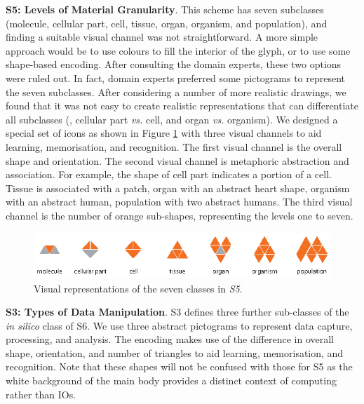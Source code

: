 \textbf{S5: Levels of Material Granularity}.
This scheme has seven subclasses (molecule, cellular part, cell, tissue, organ, organism, and population), and finding a suitable visual channel was not straightforward.
A more simple approach would be to use colours to fill the interior of the glyph, or to use some shape-based encoding.
After consulting the domain experts, these two options were ruled out.
In fact, domain experts preferred some pictograms to represent the seven subclasses.
After considering a number of more realistic drawings, we found that it was not easy to create realistic representations that can differentiate all subclasses (\eg, cellular part \emph{vs.} cell, and organ \emph{vs.} organism).
We designed a special set of icons as shown in Figure \ref{fig:s5-metaphor} with three visual channels to aid learning, memorisation, and recognition.
The first visual channel is the overall shape and orientation.
The second visual channel is metaphoric abstraction and association.
For example, the shape of cell part indicates a portion of a cell.
Tissue is associated with a patch, organ with an abstract heart shape, organism with an abstract human, population with two abstract humans.
The third visual channel is the number of orange sub-shapes, representing the levels one to seven.
\begin{figure}[t!]
\centering
\includegraphics[width=.8\textwidth]{images/glyph-taxonomy/s5-metaphor.eps}
\caption{Visual representations of the seven classes in \emph{S5}.}
\label{fig:s5-metaphor}
\vspace{-10pt}
\end{figure}

\textbf{S3: Types of Data Manipulation}.
S3 defines three further sub-classes of the \emph{in silico} class of S6.
We use three abstract pictograms to represent data capture, processing, and analysis.
The encoding makes use of the difference in overall shape, orientation, and number of triangles to aid learning, memorisation, and recognition.
Note that these shapes will not be confused with those for S5 as the white background of the main body provides a distinct context of computing rather than IOs.

